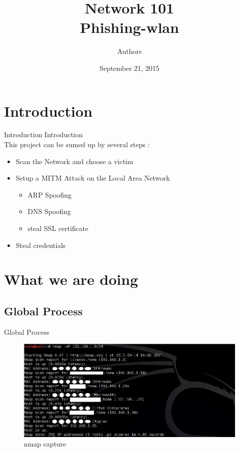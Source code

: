 \documentclass{beamer}
\title[Phishing-Wlan]{Network 101\\Phishing-wlan}
\author{Authors}
\institute{Institute}
\date{September 21, 2015}
\begin{document}
\begin{frame}
	\titlepage
\end{frame}


\section{Introduction}
\begin{frame}{Introduction}
	Introduction\\
	This project can be sumed up by several steps :\\
	\begin{itemize}
		\pause \item Scan the Network and choose a victim\\
		\pause \item Setup a MITM Attack on the Local Area Network\\
			\begin{itemize}
    			\pause \item ARP Spoofing\\
    			\pause \item DNS Spoofing\\
    			\pause \item steal SSL certificate\\
    		\end{itemize}
		\pause \item Steal credentials\\
	\end{itemize}
\end{frame}

\section{What we are doing}
\subsection{Global Process}
\begin{frame}{Global Process}
	\begin{figure}[!h]
		\centering
		\includegraphics[scale=0.45]{../images/captureNMAP.jpg}
		\caption{nmap capture} %
		\label{nmap_capture} %
	\end{figure}
\end{frame}
\end{document}
